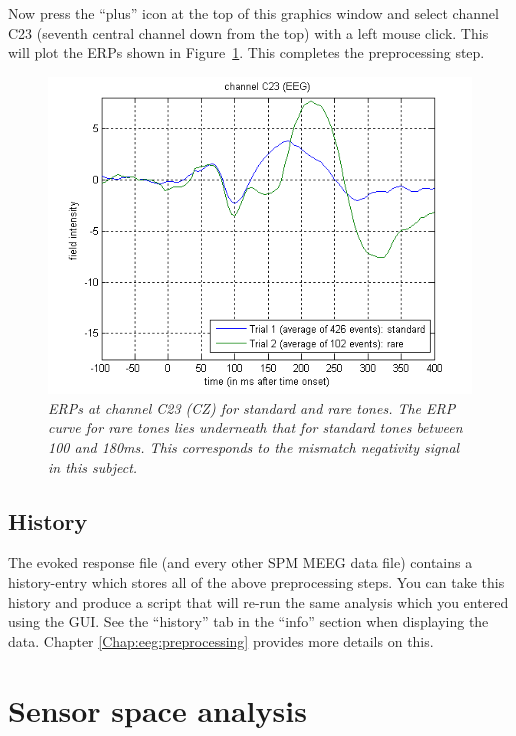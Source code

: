 Now press the ``plus'' icon at the top of this graphics window and select channel C23 (seventh central channel down from the top) with a left mouse click. This will plot the ERPs shown in Figure~\ref{c23}. This completes the preprocessing step.
\begin{figure}
\begin{center}
\includegraphics[width=120mm]{mmn/erp_c23}
\caption{\em ERPs at channel C23 (CZ) for standard and rare tones. The ERP curve for rare tones lies underneath that for standard tones between 100 and 180ms. This corresponds to the mismatch negativity signal in this subject. \label{c23}}
\end{center}
\end{figure}

\subsection{History}
The evoked response file (and every other SPM MEEG data file) contains a history-entry which stores all of the above preprocessing steps. You can take this history and produce a script that will re-run the same analysis which you entered using the GUI. See the ``history'' tab in the ``info'' section when displaying the data. Chapter \ref{Chap:eeg:preprocessing} provides more details on this.

\section{Sensor space analysis}


